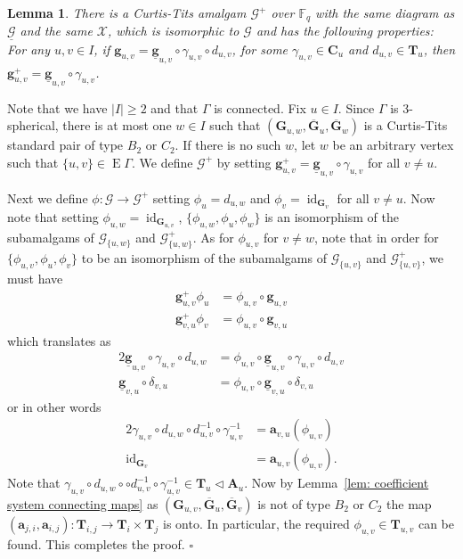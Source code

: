 \documentclass[12pt]{amsart}
\newtheorem{lemma}[theorem]{Lemma}
\theoremstyle{definition}
\newcommand{\bpf}{\noindent{\bf Proof}\hspace{7pt}}
\newcommand{\epf}{\qed}
\newcommand{\ble}{\begin{lemma}}
\newcommand{\ele}{\end{lemma}}
\newcommand{\ul}{\underline}
\renewcommand{\bar}{\overline}
\DeclareMathOperator{\id}{id}
\newcommand{\FF}{{\mathbb F}}
\newcommand{\after}{\mathbin{ \circ }}
\newcommand{\normal}{\lhd}
\newcommand{\Chi}{{\mathcal X}}
\renewcommand{\qed}{\hfill $\square$}
\newcommand{\amgrpA}{{\mathbf{A}}}
\newcommand{\amgrpC}{{\mathbf{C}}}
\newcommand{\amgrpG}{{\mathbf{G}}}
\newcommand{\amgrpT}{{\mathbf{T}}}
\newcommand{\ama}{{\mathbf a}}
\newcommand{\amg}{{\mathbf g}}
\newcommand{\famg}{\ul{\mathbf g}}
\newcommand{\bamgrpG}{\bar{\amgrpG}}
\newcommand{\famG}{\ul{\mathscr{G}}}
\newcommand{\amG}{{\mathscr{G}}}
\DeclareMathOperator{\edg}{E}
\newcommand{\liediag}{\Gamma}
\begin{document}
\ble\label{lem:stripping tori from connecting maps}
There is a  Curtis-Tits amalgam $\amG^+$ over $\FF_q$ with the same diagram as $\famG$ and the same $\Chi$, which is isomorphic to $\amG$ and has the following properties:
For any $u,v\in I$, if $\amg_{u,v}=\famg_{u,v}\after \gamma_{u,v}\after d_{u,v}$,  for some $\gamma_{u,v}\in \amgrpC_{u}$ and $d_{u,v}\in \amgrpT_u$, then $\amg_{u,v}^+=\famg_{u,v}\after\gamma_{u,v}$.
\ele
\bpf
Note that we have $|I|\ge 2$ and that $\liediag$ is connected.
Fix $u\in I$. Since $\liediag$ is $3$-spherical, there is at most one $w\in I$ such that $(\amgrpG_{u,w},\bamgrpG_u,\bamgrpG_w)$ is a Curtis-Tits standard pair of type $B_2$ or $C_2$.
If there is no such $w$, let $w$ be an arbitrary vertex such that $\{u,v\}\in \edg\liediag$.
We define $\amG^+$ by setting $\amg^+_{u,v}=\famg_{u,v} \after \gamma_{u,v}$  for all $v\ne u$.

Next we define $\phi\colon \amG\to\amG^+$ setting
 $\phi_u=d_{u,w}$ and $\phi_v=\id_{\amgrpG_v}$ for all $v\ne u$.
Now note that setting $\phi_{u,w}=\id_{\amgrpG_{u,v}}$, $\{\phi_{u,w}, \phi_u,\phi_w\}$ is an isomorphism of the subamalgams of $\amG_{\{u,w\}}$ and $\amG^+_{\{u,w\}}$.
As for $\phi_{u,v}$ for $v\ne w$, note that in order for  $\{\phi_{u,v}, \phi_u,\phi_v\}$ to be an isomorphism of the subamalgams of $\amG_{\{u,v\}}$ and $\amG^+_{\{u,v\}}$, we must have 
\begin{align*}
\amg^+_{u,v} \phi_u & = \phi_{u,v}\after\amg_{u,v}\\
\amg^+_{v,u} \phi_v & = \phi_{u,v}\after\amg_{v,u}
\end{align*}
which translates as 
\begin{alignat*}{2}
\famg_{u,v}\after\gamma_{u,v}\after d_{u,w} & = \phi_{u,v}\after\famg_{u,v}\after\gamma_{u,v}\after  d_{u,v}\\
\famg_{v,u} \after\delta_{v,u}& = \phi_{u,v}\after\famg_{v,u}\after\delta_{v,u}
\end{alignat*}
or in other words
\begin{alignat*}{2}
\gamma_{u,v} \after d_{u,w} \after d_{u,v}^{-1}\after \gamma_{u,v}^{-1} & = \ama_{v,u}(\phi_{u,v})\\
\id_{\amgrpG_v} & = \ama_{u,v}(\phi_{u,v}).
\end{alignat*}
Note that $\gamma_{u,v} \after d_{u,w} \after\after d_{u,v}^{-1}\after \gamma_{u,v}^{-1}\in \amgrpT_u\normal \amgrpA_u$. 
Now by Lemma~\ref{lem: coefficient system connecting maps} as 
 $(\amgrpG_{u,v},\bamgrpG_u,\bamgrpG_v)$ is not of type $B_2$ or $C_2$ the map $(\ama_{j,i},\ama_{i,j})\colon \amgrpT_{i,j}\to \amgrpT_i\times\amgrpT_j$ is onto. In particular, the required $\phi_{u,v}\in \amgrpT_{u,v}$ can be found.
This completes the proof.
\epf
\end{document}
